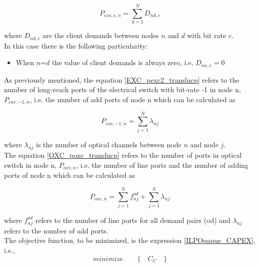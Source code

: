 \begin{equation}
P_{exc,c,n} = \sum_{d=1}^{N} D_{nd,c}
\label{EXC_pexc1_translucp}
\end{equation}

\vspace{11pt}
\noindent
where $D_{nd,c}$ are the client demands between nodes $n$ and $d$ with bit rate $c$.\\

In this case there is the following particularity:
\begin{itemize}
  \item When $n$=$d$ the value of client demands is always zero, i.e, $D_{nn,c}=0$
\end{itemize}

\vspace{11pt}
As previously mentioned, the equation \ref{EXC_pexc2_translucp} refers to the number of long-reach ports of the electrical switch with bit-rate -1 in node n, $P_{exc,-1,n}$, i.e. the number of add ports of node n which can be calculated as

\begin{equation}
P_{exc,-1,n} = \sum_{j=1}^{N} \lambda_{nj}
\label{EXC_pexc2_translucp}
\end{equation}

\vspace{11pt}
\noindent
where $\lambda_{nj}$ is the number of optical channels between node $n$ and node $j$.\\

The equation \ref{OXC_poxc_translucp} refers to the number of ports in optical switch in node n, $P_{oxc,n}$, i.e. the number of line ports and the number of adding ports of node n which can be calculated as

\begin{equation}
P_{oxc,n} = \sum_{j=1}^{N} f_{nj}^{od} + \sum_{j=1}^{N} \lambda_{nj}
\label{OXC_poxc_translucp}
\end{equation}

\vspace{11pt}
\noindent
where $f_{nj}^{od}$ refers to the number of line ports for all demand pairs (od) and $\lambda_{nj}$ refers to the number of add ports.\\

The objective function, to be minimized, is the expression \ref{ILPOpaque_CAPEX}, i.e.,
\begin{equation*}
  minimize \qquad \Big\{ \quad C_C \quad \Big\}
\end{equation*}

